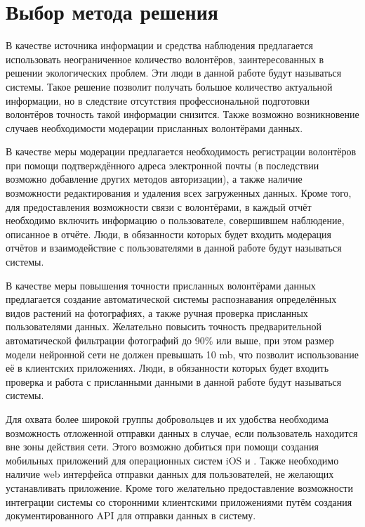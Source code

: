 
\section{Выбор метода решения}

\tab
В качестве источника информации и средства наблюдения предлагается использовать неограниченное количество волонтёров, заинтересованных в решении экологических проблем.
Эти люди в данной работе будут называться  системы.
Такое решение позволит получать большое количество актуальной информации, но в следствие отсутствия профессиональной подготовки волонтёров точность такой информации снизится.
Также возможно возникновение случаев необходимости модерации присланных волонтёрами данных.

\tab
В качестве меры модерации предлагается необходимость регистрации волонтёров при помощи подтверждённого адреса электронной почты (в последствии возможно добавление других методов авторизации), а также наличие возможности редактирования и удаления всех загруженных данных.
Кроме того, для предоставления возможности связи с волонтёрами, в каждый отчёт необходимо включить информацию о пользователе, совершившем наблюдение, описанное в отчёте.
Люди, в обязанности которых будет входить модерация отчётов и взаимодействие с пользователями в данной работе будут называться  системы.

\tab
В качестве меры повышения точности присланных волонтёрами данных предлагается создание автоматической системы распознавания определённых видов растений на фотографиях, а также ручная проверка присланных пользователями данных.
Желательно повысить точность предварительной автоматической фильтрации фотографий до 90\% или выше, при этом размер модели нейронной сети не должен превышать 10 mb, что позволит использование её в клиентских приложениях.
Люди, в обязанности которых будет входить проверка и работа с присланными данными в данной работе будут называться  системы.

\tab
Для охвата более широкой группы добровольцев и их удобства необходима возможность отложенной отправки данных в случае, если пользователь находится вне зоны действия сети.
Этого возможно добиться при помощи создания мобильных приложений для операционных систем iOS и .
Также необходимо наличие web интерфейса отправки данных для пользователей, не желающих устанавливать приложение.
Кроме того желательно предоставление возможности интеграции системы со сторонними клиентскими приложениями путём создания документированного API для отправки данных в систему.

